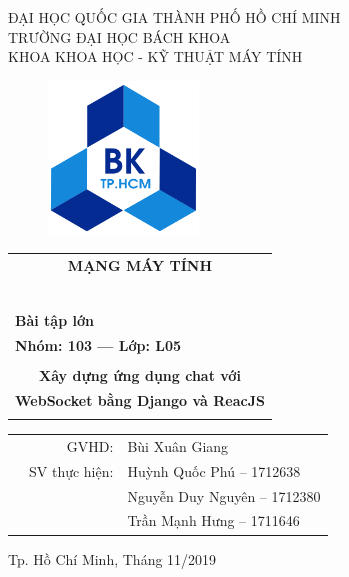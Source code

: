 \documentclass[a4paper]{article}
\begin{document}
\begin{titlepage}
\begin{center}
ĐẠI HỌC QUỐC GIA THÀNH PHỐ HỒ CHÍ MINH \\
TRƯỜNG ĐẠI HỌC BÁCH KHOA \\
KHOA KHOA HỌC - KỸ THUẬT MÁY TÍNH 
\end{center}

\vspace{1cm}

\begin{figure}[h!]
\begin{center}
\includegraphics[width=4cm]{Images/hcmut.png}
\end{center}
\end{figure}

\vspace{1cm}


\begin{center}
\begin{tabular}{c}
\multicolumn{1}{c}{\textbf{{\Huge MẠNG MÁY TÍNH}}}\\
~~\\
\hline
\\
\multicolumn{1}{l}{\textbf{{\Large Bài tập lớn}}}\\
\multicolumn{1}{l}{\textbf{{\Large Nhóm: 103 --- Lớp: L05}}}\\
\\
\textbf{{\Huge Xây dựng ứng dụng chat với}} \\
\textbf{{\Huge WebSocket bằng Django và ReacJS}}\\
\\
\hline
\end{tabular}
\end{center}

\vspace{0.75cm}

\begin{table}[h]
\begin{tabular}{rrl}
\hspace{5 cm} & GVHD: & Bùi Xuân Giang \\
& SV thực hiện: & Huỳnh Quốc Phú -- 1712638 \\
& 				& Nguyễn Duy Nguyên -- 1712380 \\
& 				& Trần Mạnh Hưng -- 1711646 \\
\end{tabular}
\end{table}
\vspace{1.5cm}
\begin{center}
{\footnotesize Tp. Hồ Chí Minh, Tháng 11/2019}
\end{center}
\end{titlepage}
\end{document}
